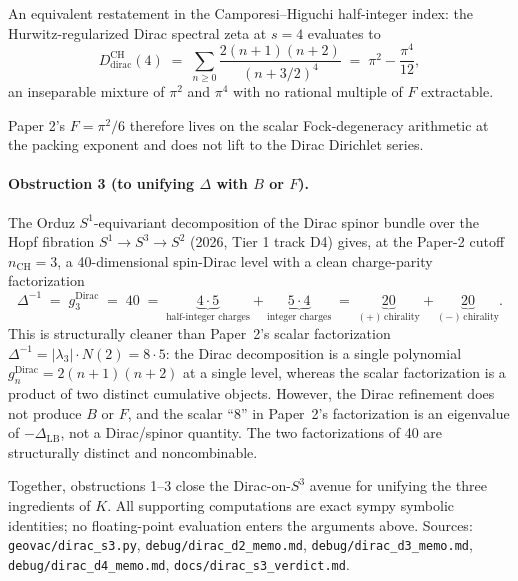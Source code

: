 An equivalent restatement in the Camporesi--Higuchi half-integer index:
the Hurwitz-regularized Dirac spectral zeta at $s=4$ evaluates to
\begin{equation}\label{eq:D_dirac_ch}
  D_{\text{dirac}}^{\text{CH}}(4)
  \;=\; \sum_{n\geq 0}\frac{2(n+1)(n+2)}{(n+3/2)^{4}}
  \;=\; \pi^{2} - \frac{\pi^{4}}{12},
\end{equation}
an inseparable mixture of $\pi^{2}$ and $\pi^{4}$ with no rational
multiple of $F$ extractable.

Paper 2's $F = \pi^{2}/6$ therefore lives on the scalar Fock-degeneracy
arithmetic at the packing exponent and does not lift to the Dirac
Dirichlet series.

\paragraph{Obstruction 3 (to unifying $\Delta$ with $B$ or $F$).}
The Orduz $S^{1}$-equivariant decomposition of the Dirac spinor bundle
over the Hopf fibration $S^{1} \to S^{3} \to S^{2}$ (2026, Tier 1 track
D4) gives, at the Paper-2 cutoff $n_{\text{CH}} = 3$, a 40-dimensional
spin-Dirac level with a clean charge-parity factorization
\begin{equation}\label{eq:Delta_hopf}
  \Delta^{-1} \;=\; g_{3}^{\text{Dirac}} \;=\; 40
  \;=\; \underbrace{4 \cdot 5}_{\text{half-integer charges}}
      + \underbrace{5 \cdot 4}_{\text{integer charges}}
  \;=\; \underbrace{20}_{(+)\,\text{chirality}}
      + \underbrace{20}_{(-)\,\text{chirality}}.
\end{equation}
This is structurally cleaner than Paper~2's scalar factorization
$\Delta^{-1} = |\lambda_{3}|\cdot N(2) = 8 \cdot 5$: the Dirac
decomposition is a single polynomial $g_{n}^{\text{Dirac}} = 2(n+1)(n+2)$
at a single level, whereas the scalar factorization is a product of two
distinct cumulative objects. However, the Dirac refinement does not
produce $B$ or $F$, and the scalar ``8'' in Paper~2's factorization is
an eigenvalue of $-\Delta_{\text{LB}}$, not a Dirac/spinor quantity.
The two factorizations of 40 are structurally distinct and
noncombinable.

Together, obstructions 1--3 close the Dirac-on-$S^{3}$ avenue for
unifying the three ingredients of $K$. All supporting computations are
exact sympy symbolic identities; no floating-point evaluation enters
the arguments above. Sources:
\texttt{geovac/dirac\_s3.py},
\texttt{debug/dirac\_d2\_memo.md},
\texttt{debug/dirac\_d3\_memo.md},
\texttt{debug/dirac\_d4\_memo.md},
\texttt{docs/dirac\_s3\_verdict.md}.

